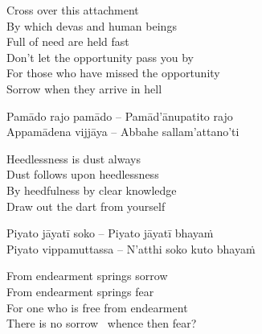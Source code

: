 \begin{english-verses}
  Cross over this attachment\\
  By which devas and human beings\\
  Full of need are held fast\\
  Don't let the opportunity pass you by\\
  For those who have missed the opportunity\\
  Sorrow when they arrive in hell
\end{english-verses}

\begin{verses}
  Pamādo rajo pamādo – Pamād'ānupatito rajo\\
  Appamādena vijjāya – Abbahe sallam'attano'ti
\end{verses}

\begin{english-verses}
  Heedlessness is dust always\\
  Dust follows upon heedlessness\makeatletter\hyperlink{endnote42-appendix}\makeatother\\
  By heedfulness by clear knowledge\\
  Draw out the dart from yourself
\end{english-verses}

\suttaRef{[Snp 333-336]}

\begin{verses}
  Piyato jāyatī soko – Piyato jāyatī bhayaṁ\\
  Piyato vippamuttassa – N'atthi soko kuto bhayaṁ
\end{verses}

\begin{english-verses}
  From endearment springs sorrow\\
  From endearment springs fear\\
  For one who is free from endearment\\
  There is no sorrow \breathmark\ whence then fear?
\end{english-verses}

